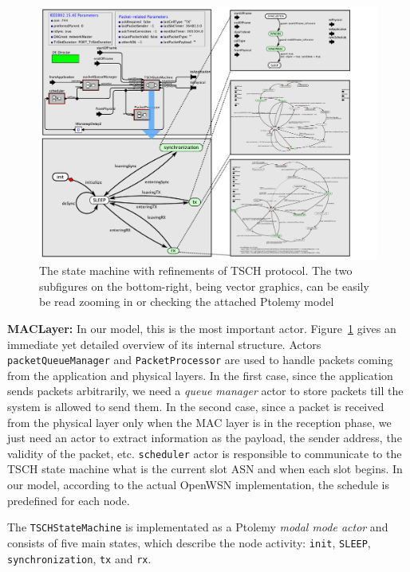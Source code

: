 \begin{figure}[t]
\centering
\includegraphics[width=\columnwidth]{figures/PaperTSCHStateMachine}
\caption{\small The state machine with refinements of TSCH protocol. The two subfigures on the bottom-right, being vector graphics, can be easily be read zooming in or checking the attached Ptolemy model}
\label{fig:TSCHSM}
\end{figure}

{\bf MACLayer:} In our model, this is the most important actor. Figure~\ref{fig:TSCHSM} gives an immediate yet detailed overview of its internal structure.
Actors \texttt{packetQueueManager} and \texttt{PacketProcessor} are used to handle packets coming from the application and physical layers. In the first case, since the application sends packets arbitrarily, we need a \emph{queue manager} actor to store packets till the system is allowed to send them. In the second case, since a packet is received from the physical layer only when the MAC layer is in the reception phase, we just need an actor to extract information as the payload, the sender address, the validity of the packet, etc.
\texttt{scheduler} actor is responsible to communicate to the TSCH state machine what is the current slot ASN and when each slot begins. In our model, according to the actual OpenWSN implementation, the schedule is predefined for each node. 

The \texttt{TSCHStateMachine} is implementated as a Ptolemy \emph{modal mode actor} and consists of five main states, which describe the node activity: \texttt{init}, \texttt{SLEEP}, \texttt{synchronization}, \texttt{tx} and \texttt{rx}. 

